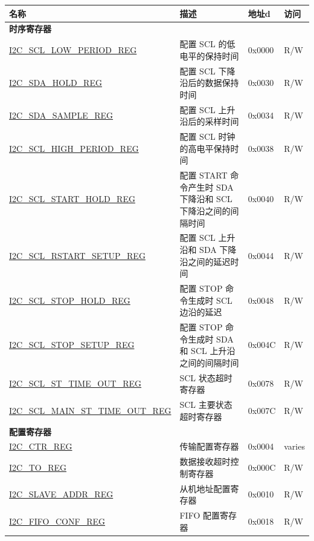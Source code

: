 \begin{longtable}{ | p{6cm} | p{7cm} | p{1.3cm} | p{1cm} | }
\hline\rowcolor{lightgray}
名称 & 描述 &  地址d & 访问 \\ \hline
\endhead
\multicolumn{4}{|l|}{\textbf{时序寄存器}} \\ \hline
\hyperref[regdesc:I2CSCLLOWPERIODREG]{I2C\_SCL\_LOW\_PERIOD\_REG} & 配置 SCL 的低电平的保持时间 & 0x0000 & R/W \\ \hline
\hyperref[regdesc:I2CSDAHOLDREG]{I2C\_SDA\_HOLD\_REG} & 配置 SCL 下降沿后的数据保持时间 & 0x0030 & R/W \\ \hline
\hyperref[regdesc:I2CSDASAMPLEREG]{I2C\_SDA\_SAMPLE\_REG} & 配置 SCL 上升沿后的采样时间 & 0x0034 & R/W \\ \hline
\hyperref[regdesc:I2CSCLHIGHPERIODREG]{I2C\_SCL\_HIGH\_PERIOD\_REG} & 配置 SCL 时钟的高电平保持时间 & 0x0038 & R/W \\ \hline
\hyperref[regdesc:I2CSCLSTARTHOLDREG]{I2C\_SCL\_START\_HOLD\_REG} & 配置 START 命令产生时 SDA 下降沿和 SCL 下降沿之间的间隔时间 & 0x0040 & R/W \\ \hline
\hyperref[regdesc:I2CSCLRSTARTSETUPREG]{I2C\_SCL\_RSTART\_SETUP\_REG} & 配置 SCL 上升沿和 SDA 下降沿之间的延迟时间 & 0x0044 & R/W \\ \hline
\hyperref[regdesc:I2CSCLSTOPHOLDREG]{I2C\_SCL\_STOP\_HOLD\_REG} & 配置 STOP 命令生成时 SCL 边沿的延迟 & 0x0048 & R/W \\ \hline
\hyperref[regdesc:I2CSCLSTOPSETUPREG]{I2C\_SCL\_STOP\_SETUP\_REG} & 配置 STOP 命令生成时 SDA 和 SCL 上升沿之间的间隔时间 & 0x004C & R/W \\ \hline
\hyperref[regdesc:I2CSCLSTTIMEOUTREG]{I2C\_SCL\_ST\_TIME\_OUT\_REG} & SCL 状态超时寄存器 & 0x0078 & R/W \\ \hline
\hyperref[regdesc:I2CSCLMAINSTTIMEOUTREG]{I2C\_SCL\_MAIN\_ST\_TIME\_OUT\_REG} & SCL 主要状态超时寄存器 & 0x007C & R/W \\ \hline
\multicolumn{4}{|l|}{\textbf{配置寄存器}} \\ \hline
\hyperref[regdesc:I2CCTRREG]{I2C\_CTR\_REG} & 传输配置寄存器 & 0x0004 & varies \\ \hline
\hyperref[regdesc:I2CTOREG]{I2C\_TO\_REG} & 数据接收超时控制寄存器 & 0x000C & R/W \\ \hline
\hyperref[regdesc:I2CSLAVEADDRREG]{I2C\_SLAVE\_ADDR\_REG} & 从机地址配置寄存器 & 0x0010 & R/W \\ \hline
\hyperref[regdesc:I2CFIFOCONFREG]{I2C\_FIFO\_CONF\_REG} & FIFO 配置寄存器 & 0x0018 & R/W \\ \hline

\end{longtable}

